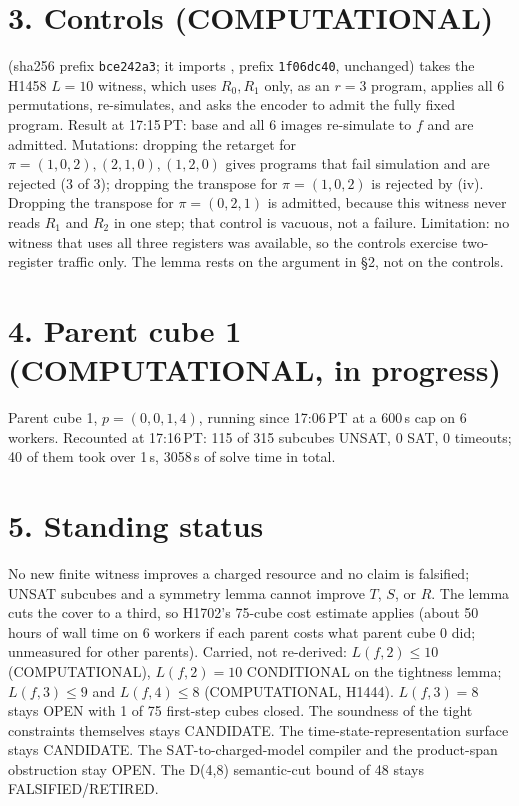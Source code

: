 \documentclass[11pt]{article}
\begin{document}
\section*{3. Controls (COMPUTATIONAL)}
 (sha256 prefix \texttt{bce242a3}; it imports , prefix \texttt{1f06dc40}, unchanged) takes the H1458 $L=10$ witness, which uses $R_0,R_1$ only, as an $r=3$ program, applies all 6 permutations, re-simulates, and asks the encoder to admit the fully fixed program. Result at 17:15\,PT: base and all 6 images re-simulate to $f$ and are admitted. Mutations: dropping the retarget for $\pi=(1,0,2),(2,1,0),(1,2,0)$ gives programs that fail simulation and are rejected (3 of 3); dropping the transpose for $\pi=(1,0,2)$ is rejected by (iv). Dropping the transpose for $\pi=(0,2,1)$ is admitted, because this witness never reads $R_1$ and $R_2$ in one step; that control is vacuous, not a failure. Limitation: no witness that uses all three registers was available, so the controls exercise two-register traffic only. The lemma rests on the argument in \S2, not on the controls.

\section*{4. Parent cube 1 (COMPUTATIONAL, in progress)}
Parent cube 1, $p=(0,0,1,4)$, running since 17:06\,PT at a 600\,s cap on 6 workers. Recounted at 17:16\,PT: 115 of 315 subcubes UNSAT, 0 SAT, 0 timeouts; 40 of them took over 1\,s, 3058\,s of solve time in total.

\section*{5. Standing status}
No new finite witness improves a charged resource and no claim is falsified; UNSAT subcubes and a symmetry lemma cannot improve $T$, $S$, or $R$. The lemma cuts the cover to a third, so H1702's 75-cube cost estimate applies (about 50 hours of wall time on 6 workers if each parent costs what parent cube 0 did; unmeasured for other parents). Carried, not re-derived: $L(f,2)\le 10$ (COMPUTATIONAL), $L(f,2)=10$ CONDITIONAL on the tightness lemma; $L(f,3)\le 9$ and $L(f,4)\le 8$ (COMPUTATIONAL, H1444). $L(f,3)=8$ stays OPEN with 1 of 75 first-step cubes closed. The soundness of the tight constraints themselves stays CANDIDATE. The time-state-representation surface stays CANDIDATE. The SAT-to-charged-model compiler and the product-span obstruction stay OPEN. The D(4,8) semantic-cut bound of 48 stays FALSIFIED/RETIRED.
\end{document}
